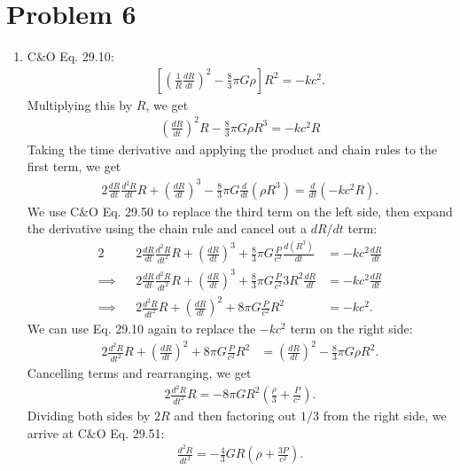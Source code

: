 \documentclass[11pt,letterpaper]{article}
\begin{document}
\newpage

\section*{Problem 6}
\begin{enumerate}[label=(\roman*)]
    \item C\&O Eq. 29.10:
        \begin{align*}
            \left[\left(\frac{1}{R}\frac{dR}{dt}\right)^2 - \frac{8}{3}\pi G\rho\right]R^2 = -kc^2.
        \end{align*}
        Multiplying this by $R$, we get 
        \begin{align*}
            \left(\frac{dR}{dt}\right)^2 R - \frac{8}{3}\pi G\rho R^3 = -kc^2R 
        \end{align*}
        Taking the time derivative and applying the product and chain rules to the first term, we get 
        \begin{align*}
            2\frac{dR}{dt}\frac{d^2R}{dt}R + \left(\frac{dR}{dt}\right)^3 - \frac{8}{3}\pi G \frac{d}{dt}(\rho R^3) = \frac{d}{dt}(-kc^2R).
        \end{align*}
        We use C\&O Eq. 29.50 to replace the third term on the left side, then expand the derivative using the chain rule and cancel out a $dR/dt$ term:
        \begin{alignat*}{2}
            &&2\frac{dR}{dt}\frac{d^2R}{dt^2}R + \left(\frac{dR}{dt}\right)^3 + \frac{8}{3}\pi G\frac{P}{c^2}\frac{d(R^3)}{dt} &= -kc^2\frac{dR}{dt} \\
            \implies&&2\frac{dR}{dt}\frac{d^2R}{dt^2}R + \left(\frac{dR}{dt}\right)^3 + \frac{8}{3}\pi G\frac{P}{c^2}3R^2\frac{dR}{dt} &= -kc^2\frac{dR}{dt} \\
            \implies&&2\frac{d^2R}{dt^2}R + \left(\frac{dR}{dt}\right)^2 + 8\pi G\frac{P}{c^2}R^2 &= -kc^2.
        \end{alignat*}
        We can use Eq. 29.10 again to replace the $-kc^2$ term on the right side: 
        \begin{align*}
            2\frac{d^2R}{dt^2}R + \left(\frac{dR}{dt}\right)^2 + 8\pi G\frac{P}{c^2}R^2 &= \left(\frac{dR}{dt}\right)^2 - \frac{8}{3}\pi G\rho R^2.
        \end{align*}
        Cancelling terms and rearranging, we get 
        \begin{align*}
            2\frac{d^2R}{dt^2}R = -8\pi GR^2(\frac{\rho}{3} + \frac{P}{c^2}).
        \end{align*}
        Dividing both sides by $2R$ and then factoring out $1/3$ from the right side, we arrive at C\&O Eq. 29.51:
        \begin{align*}
            \frac{d^2R}{dt^2} = -\frac{4}{3}GR(\rho + \frac{3P}{c^2}).
        \end{align*}


\end{enumerate}
\end{document}
